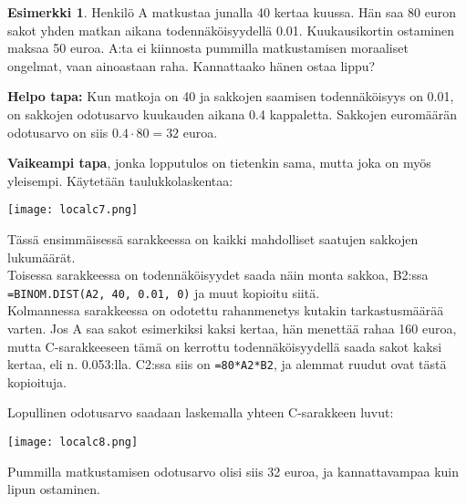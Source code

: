\documentclass[12pt,leqno,a4paper,oneside]{amsart}
\theoremstyle{definition}
\newtheorem{example}[proclaim]{Esimerkki}
\theoremstyle{remark}
\numberwithin{equation}{section}
\begin{document}
\begin{example}
 Henkilö A matkustaa junalla 40 kertaa kuussa. Hän saa 80 euron sakot yhden matkan aikana todennäköisyydellä 0.01. Kuukausi\-kortin ostaminen maksaa 50 euroa.
 A:ta ei kiinnosta pummilla matkustamisen moraaliset ongelmat, vaan ainoastaan raha. Kannattaako hänen ostaa lippu?
 
 \textbf{Helpo tapa:} Kun matkoja on 40 ja sakkojen saamisen todennäköisyys on 0.01, on sakkojen odotusarvo kuukauden aikana 0.4 kappaletta. 
 Sakkojen euromäärän odotusarvo on siis $0.4\cdot80=32$ euroa.
 
 \textbf{Vaikeampi tapa}, jonka lopputulos on tietenkin sama, mutta joka on myös yleisempi. Käytetään taulukkolaskentaa:
 
 \texttt{[image: localc7.png]}
 
 Tässä ensimmäisessä sarakkeessa on kaikki mahdolliset saatujen sakkojen lukumäärät.\\
 Toisessa sarakkeessa on todennäköisyydet saada näin monta sakkoa, B2:ssa \texttt{=BINOM.DIST(A2, 40, 0.01, 0)} ja muut kopioitu siitä.\\
 Kolmannessa sarakkeessa on odotettu rahanmenetys kutakin tarkastusmäärää varten. Jos A saa sakot esimerkiksi kaksi kertaa, hän menettää 
 rahaa 160 euroa, mutta C-sarakkeeseen tämä on kerrottu todennäköisyydellä saada sakot kaksi kertaa, eli n. 0.053:lla.
 C2:ssa siis on \texttt{=80*A2*B2}, ja alemmat ruudut ovat tästä kopioituja.
 
 Lopullinen odotusarvo saadaan laskemalla yhteen C-sarakkeen luvut:
 
 \texttt{[image: localc8.png]}
 
 Pummilla matkustamisen odotusarvo olisi siis 32 euroa, ja kannattavampaa kuin lipun ostaminen.
\end{example}
% 
\end{document}
